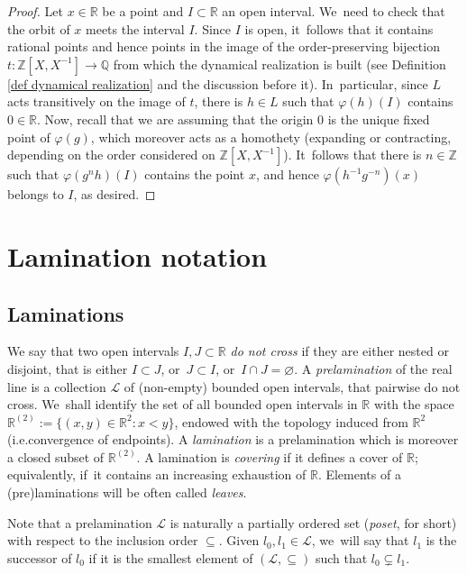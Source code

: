 \documentclass[10pt]{amsart}
\newcommand{\ie}{i.e.}
\theoremstyle{definition}
\newcommand{\R}{\mathbb{R}}
\newcommand{\Q}{\mathbb Q}
\newcommand{\Z}{\mathbb Z}
\newcommand{\Lcal}{\mathcal{L}}
\begin{document}
\begin{proof} Let $x\in \R$ be a point and $I\subset \R$ an open interval. We~need to check that the orbit of $x$ meets the interval $I$.
Since $I$ is open, it~follows that it contains rational points and hence points in the image of the order-preserving bijection $t\colon \Z[X,X^{-1}]\to \Q$ from which the dynamical realization is built (see Definition \ref{def dynamical realization} and the discussion before it). In~particular, since $L$ acts transitively on the image of $t$, there is $h\in L$ such that $\varphi(h)(I)$ contains $0\in \R$. Now, recall that we are assuming that the origin $0$ is the unique fixed point of $\varphi(g)$, which moreover acts as a homothety (expanding or contracting, depending on the order considered on $\Z[X,X^{-1}]$). It~follows that there is $n\in \Z$ such that $\varphi(g^nh)(I)$ contains the point $x$, and hence $\varphi(h^{-1}g^{-n})(x)$ belongs to $I$, as desired.
\end{proof}

\section{Lamination notation}\label{sec generalities}
\subsection{Laminations}
We say that two open intervals $I,J\subset \R$ \emph{do not cross} if they are either nested or disjoint, that is either $I\subset J$, or~$J\subset I$, or~$I\cap J=\varnothing$. A \emph{prelamination} of the real line is a collection $\Lcal$ of (non-empty) bounded open intervals, that pairwise do not cross. We~shall identify the set of all bounded open intervals in $\R$ with the space $\R^{(2)}:=\{(x, y)\in \R^2: x<y\}$, endowed with the topology induced from $\R^2$ (\ie convergence of endpoints). A \emph{lamination} is a prelamination which is moreover a closed subset of $\R^{(2)}$. A lamination is \emph{covering} if it defines a cover of $\R$; equivalently, if~it contains an increasing exhaustion of $\R$. Elements of a (pre)laminations will be often called \emph{leaves}.

Note that a prelamination $\Lcal$ is naturally a partially ordered set (\emph{poset}, for short) with respect to the inclusion order $\subseteq$. Given $l_0, l_1\in \Lcal$, we~will say that $l_1$ is the successor of $l_0$ if it is the smallest element of $(\Lcal, \subseteq)$ such that $l_0\subsetneq l_1$.
\end{document}
